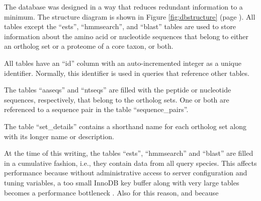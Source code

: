 The database was designed in a way that reduces redundant information to a
minimum. The structure diagram is shown in Figure \ref{fig:dbstructure} (page
\pageref{fig:dbstructure}). All tables except the ``ests'', ``hmmsearch'', and
``blast'' tables are used to store information about the amino acid or
nucleotide sequences that belong to either an ortholog set or a proteome of a
core taxon, or both. 

All tables have an ``id'' column with an auto-incremented integer as a unique
identifier. Normally, this identifier is used in  queries that
reference other tables.

The tables ``aaseqs'' and ``ntseqs'' are filled with the peptide or
nucleotide sequences, respectively, that belong to the ortholog sets. One or
both are referenced to a sequence pair in the table ``sequence\_pairs''. 

The table ``set\_details'' contains a shorthand name for each ortholog set along
with its longer name or description. 

At the time of this writing, the tables ``ests'', ``hmmsearch'' and ``blast''
are filled in a cumulative fashion, i.e., they contain data from all query
species. This affects performance because without administrative access to
server configuration and tuning variables, a too small InnoDB key buffer along
with very large tables becomes a performance bottleneck \citep{mysql2013}. Also
for this reason, and because


%


